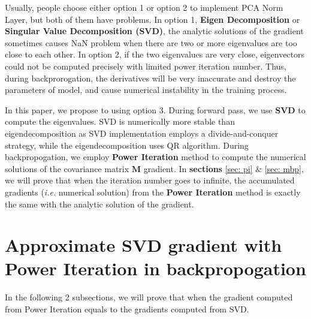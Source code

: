 \documentclass{article}
\newcommand{\bM}{\mathbf{M}}
\begin{document}
Usually, people choose either option 1 or option 2 to implement PCA Norm Layer, but both of them have problems.
In option 1, \textbf{Eigen Decomposition} or \textbf{Singular Value Decomposition (SVD)}, the analytic solutions of the gradient sometimes causes NaN problem when there are two or more eigenvalues are too close to each other.
In option 2, if the two eigenvalues are very close, eigenvectors could not be computed precisely with limited power iteration number. Thus, during backprorogation, the derivatives will be very inaccurate and destroy the parameters of model, and cause numerical instability in the training process.

In this paper, we propose to using option 3. During forward pass, we use \textbf{SVD} to compute the eigenvalues. 
SVD is numerically more stable than eigendecomposition \cite{nakatsukasa2013stable} as SVD implementation employs a divide-and-conquer strategy, while the eigendecomposition uses QR algorithm. 
During backpropogation, we employ \textbf{Power Iteration} method to compute the numerical solutions of the covariance matrix $\bM$ gradient.
In \textbf{sections} \ref{sec: pi} \& \ref{sec: mbp}, we will prove that when the iteration number goes to infinite, the accumulated gradients (\emph{i.e.} numerical solution) from the \textbf{Power Iteration} method is exactly the same with the analytic solution of the gradient.


\newpage

\section{Approximate SVD gradient with Power Iteration in backpropogation}
In the following 2 subsections, we will prove that when the gradient computed from Power Iteration equals to the gradients computed from SVD.
\end{document}
